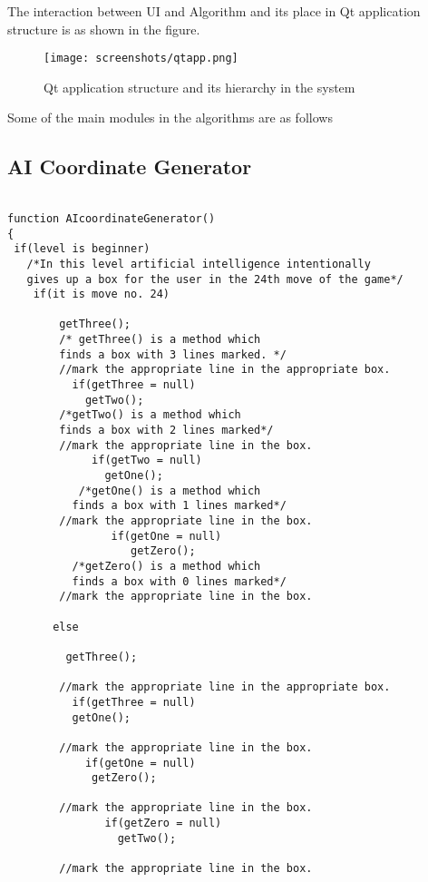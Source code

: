 \documentclass[a4paper,12pt]{article}
\begin{document}
The interaction between UI and Algorithm and its place in Qt application structure is as shown in the figure. 

\begin{figure}[htp]
\centering
\texttt{[image: screenshots/qtapp.png]}
\caption{Qt application structure and its hierarchy in the system}
\end{figure}

Some of the main modules in the algorithms are as follows

\subsection{AI Coordinate Generator}
\begin{verbatim}
                                             
function AIcoordinateGenerator()
{
 if(level is beginner)
   /*In this level artificial intelligence intentionally 
   gives up a box for the user in the 24th move of the game*/
    if(it is move no. 24)
       
        getThree();
        /* getThree() is a method which
        finds a box with 3 lines marked. */
        //mark the appropriate line in the appropriate box.
          if(getThree = null)
            getTwo();
        /*getTwo() is a method which
        finds a box with 2 lines marked*/
        //mark the appropriate line in the box.
             if(getTwo = null)
               getOne();
           /*getOne() is a method which
          finds a box with 1 lines marked*/
        //mark the appropriate line in the box.
                if(getOne = null)
                   getZero();
          /*getZero() is a method which 
          finds a box with 0 lines marked*/
        //mark the appropriate line in the box.
        
       else
        
         getThree();
        
        //mark the appropriate line in the appropriate box.
          if(getThree = null)
          getOne();
        
        //mark the appropriate line in the box.
            if(getOne = null)
             getZero();
           
        //mark the appropriate line in the box.
               if(getZero = null)
                 getTwo();
          
        //mark the appropriate line in the box.


\end{verbatim}
\end{document}
